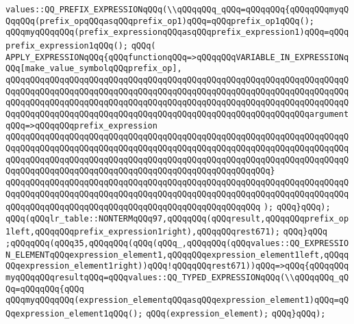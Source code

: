 \verb|values::QQ_PREFIX_EXPRESSIONqQQq(\\qQQqqQQq_qQQq=qQQqqQQq{qQQqqQQqmyqQQqqQQq(prefix_opqQQqasqQQqprefix_op1)qQQq=qQQqprefix_op1qQQq();|\newline
\verb|qQQqmyqQQqqQQq(prefix_expressionqQQqasqQQqprefix_expression1)qQQq=qQQqprefix_expression1qQQq();|\newline
\verb|qQQq(|\newline
\verb|APPLY_EXPRESSIONqQQq{qQQqfunctionqQQq=>qQQqqQQqVARIABLE_IN_EXPRESSIONqQQq[make_value_symbolqQQqprefix_op],|\newline
\verb|qQQqqQQqqQQqqQQqqQQqqQQqqQQqqQQqqQQqqQQqqQQqqQQqqQQqqQQqqQQqqQQqqQQqqQQqqQQqqQQqqQQqqQQqqQQqqQQqqQQqqQQqqQQqqQQqqQQqqQQqqQQqqQQqqQQqqQQqqQQqqQQqqQQqqQQqqQQqqQQqqQQqqQQqqQQqqQQqqQQqqQQqqQQqqQQqqQQqqQQqqQQqqQQqqQQqqQQqqQQqqQQqqQQqqQQqqQQqqQQqqQQqqQQqqQQqqQQqqQQqqQQqqQQqqQQqargumentqQQq=>qQQqqQQqprefix_expression|\newline
\verb|qQQqqQQqqQQqqQQqqQQqqQQqqQQqqQQqqQQqqQQqqQQqqQQqqQQqqQQqqQQqqQQqqQQqqQQqqQQqqQQqqQQqqQQqqQQqqQQqqQQqqQQqqQQqqQQqqQQqqQQqqQQqqQQqqQQqqQQqqQQqqQQqqQQqqQQqqQQqqQQqqQQqqQQqqQQqqQQqqQQqqQQqqQQqqQQqqQQqqQQqqQQqqQQqqQQqqQQqqQQqqQQqqQQqqQQqqQQqqQQqqQQqqQQqqQQqqQQqqQQqqQQq}|\newline
\verb|qQQqqQQqqQQqqQQqqQQqqQQqqQQqqQQqqQQqqQQqqQQqqQQqqQQqqQQqqQQqqQQqqQQqqQQqqQQqqQQqqQQqqQQqqQQqqQQqqQQqqQQqqQQqqQQqqQQqqQQqqQQqqQQqqQQqqQQqqQQqqQQqqQQqqQQqqQQqqQQqqQQqqQQqqQQqqQQqqQQqqQQqqQQqqQQq|\newline
\verb|);|\newline
\verb|qQQq}qQQq);|\newline
\verb|qQQq(qQQqlr_table::NONTERMqQQq97,qQQqqQQq(qQQqresult,qQQqqQQqprefix_op1left,qQQqqQQqprefix_expression1right),qQQqqQQqrest671);|\newline
\verb|qQQq}qQQq|\newline
\verb|;qQQqqQQq(qQQq35,qQQqqQQq(qQQq(qQQq_,qQQqqQQq(qQQqvalues::QQ_EXPRESSION_ELEMENTqQQqexpression_element1,qQQqqQQqexpression_element1left,qQQqqQQqexpression_element1right))qQQq!qQQqqQQqrest671))qQQq=>qQQq{qQQqqQQqmyqQQqqQQqresultqQQq=qQQqvalues::QQ_TYPED_EXPRESSIONqQQq(\\qQQqqQQq_qQQq=qQQqqQQq{qQQq|\newline
\verb|qQQqmyqQQqqQQq(expression_elementqQQqasqQQqexpression_element1)qQQq=qQQqexpression_element1qQQq();|\newline
\verb|qQQq(expression_element);|\newline
\verb|qQQq}qQQq);|\newline
